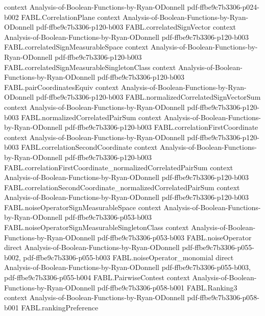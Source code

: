 \begin{theorem}
  {context}
  {Analysis-of-Boolean-Functions-by-Ryan-ODonnell}
  {pdf-ffbe9c7b3306-p024-b002}
\proofstep
  {FABL.CorrelationPlane}
  {context}
  {Analysis-of-Boolean-Functions-by-Ryan-ODonnell}
  {pdf-ffbe9c7b3306-p120-b003}
\proofstep
  {FABL.correlatedSignVector}
  {context}
  {Analysis-of-Boolean-Functions-by-Ryan-ODonnell}
  {pdf-ffbe9c7b3306-p120-b003}
\proofstep
  {FABL.correlatedSignMeasurableSpace}
  {context}
  {Analysis-of-Boolean-Functions-by-Ryan-ODonnell}
  {pdf-ffbe9c7b3306-p120-b003}
\proofstep
  {FABL.correlatedSignMeasurableSingletonClass}
  {context}
  {Analysis-of-Boolean-Functions-by-Ryan-ODonnell}
  {pdf-ffbe9c7b3306-p120-b003}
\proofstep
  {FABL.pairCoordinatesEquiv}
  {context}
  {Analysis-of-Boolean-Functions-by-Ryan-ODonnell}
  {pdf-ffbe9c7b3306-p120-b003}
\proofstep
  {FABL.normalizedCorrelatedSignVectorSum}
  {context}
  {Analysis-of-Boolean-Functions-by-Ryan-ODonnell}
  {pdf-ffbe9c7b3306-p120-b003}
\proofstep
  {FABL.normalizedCorrelatedPairSum}
  {context}
  {Analysis-of-Boolean-Functions-by-Ryan-ODonnell}
  {pdf-ffbe9c7b3306-p120-b003}
\proofstep
  {FABL.correlationFirstCoordinate}
  {context}
  {Analysis-of-Boolean-Functions-by-Ryan-ODonnell}
  {pdf-ffbe9c7b3306-p120-b003}
\proofstep
  {FABL.correlationSecondCoordinate}
  {context}
  {Analysis-of-Boolean-Functions-by-Ryan-ODonnell}
  {pdf-ffbe9c7b3306-p120-b003}
\proofstep
  {FABL.correlationFirstCoordinate_normalizedCorrelatedPairSum}
  {context}
  {Analysis-of-Boolean-Functions-by-Ryan-ODonnell}
  {pdf-ffbe9c7b3306-p120-b003}
\proofstep
  {FABL.correlationSecondCoordinate_normalizedCorrelatedPairSum}
  {context}
  {Analysis-of-Boolean-Functions-by-Ryan-ODonnell}
  {pdf-ffbe9c7b3306-p120-b003}
\proofstep
  {FABL.noiseOperatorSignMeasurableSpace}
  {context}
  {Analysis-of-Boolean-Functions-by-Ryan-ODonnell}
  {pdf-ffbe9c7b3306-p053-b003}
\proofstep
  {FABL.noiseOperatorSignMeasurableSingletonClass}
  {context}
  {Analysis-of-Boolean-Functions-by-Ryan-ODonnell}
  {pdf-ffbe9c7b3306-p053-b003}
\proofstep
  {FABL.noiseOperator}
  {direct}
  {Analysis-of-Boolean-Functions-by-Ryan-ODonnell}
  {pdf-ffbe9c7b3306-p055-b002,
    pdf-ffbe9c7b3306-p055-b003}
\proofstep
  {FABL.noiseOperator_monomial}
  {direct}
  {Analysis-of-Boolean-Functions-by-Ryan-ODonnell}
  {pdf-ffbe9c7b3306-p055-b003,
    pdf-ffbe9c7b3306-p055-b004}
\proofstep
  {FABL.PairwiseContest}
  {context}
  {Analysis-of-Boolean-Functions-by-Ryan-ODonnell}
  {pdf-ffbe9c7b3306-p058-b001}
\proofstep
  {FABL.Ranking3}
  {context}
  {Analysis-of-Boolean-Functions-by-Ryan-ODonnell}
  {pdf-ffbe9c7b3306-p058-b001}
\proofstep
  {FABL.rankingPreference}

\end{theorem}
